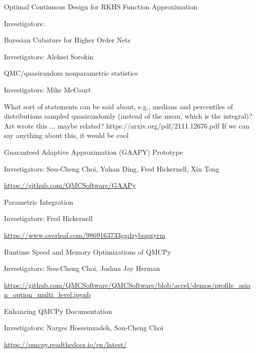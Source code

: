 \documentclass[10pt,compress,xcolor={usenames,dvipsnames},aspectratio=169]{beamer}
\begin{document}
\begin{frame}{Optimal Continuous Design for RKHS Function Approximation}

Investigators: 

\url{}
   
\end{frame}


\begin{frame}{Bayesian Cubature for Higher Order Nets}
   
Investigators: Aleksei Sorokin

\end{frame}


\begin{frame}{QMC/quasirandom nonparametric statistics}
   
Investigators: Mike McCourt

What sort of statements can be said about, e.g., medians and percentiles of distributions sampled quasirandomly (instead of the mean, which is the integral)?  Art wrote this ... maybe related?  https://arxiv.org/pdf/2111.12676.pdf
If we can say anything about this, it would be cool


\end{frame}


\begin{frame}{Guaranteed Adaptive Approximation (GAAPY) Prototype}


Investigators: Sou-Cheng Choi, Yuhan Ding, Fred Hickernell, Xin Tong

\url{https://github.com/QMCSoftware/GAAPy}


\end{frame}


\begin{frame}{Parametric Integration}


Investigators: Fred Hickernell

\url{https://www.overleaf.com/9869163733ggdzybqpxyrm}


\end{frame}

\begin{frame}{Runtime Speed and Memory Optimizations of QMCPy}

Investigators: Sou-Cheng Choi, Joshua Jay Herman

\url{https://github.com/QMCSoftware/QMCSoftware/blob/accel/demos/profile_asian_option_multi_level.ipynb}

\end{frame}



\begin{frame}{Enhancing QMCPy Documentation}


Investigators: Narges Hosseinzadeh, Sou-Cheng Choi

\url{https://qmcpy.readthedocs.io/en/latest/}


\end{frame}
\end{document}
